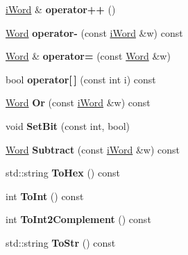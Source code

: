 \begin{DoxyCompactItemize}
\item 
\hypertarget{classWord_a3837f49bcb44597e6d738ccb0eeed144}{
\hyperlink{classiWord}{iWord} \& {\bfseries operator++} ()}
\label{classWord_a3837f49bcb44597e6d738ccb0eeed144}

\item 
\hypertarget{classWord_af930dcccdcf2cdbb90df31ac61a4933c}{
\hyperlink{classWord}{Word} {\bfseries operator-\/} (const \hyperlink{classiWord}{iWord} \&w) const }
\label{classWord_af930dcccdcf2cdbb90df31ac61a4933c}

\item 
\hypertarget{classWord_a437535c5c19c0ecfc01d52e2c297fe2c}{
\hyperlink{classWord}{Word} \& {\bfseries operator=} (const \hyperlink{classWord}{Word} \&w)}
\label{classWord_a437535c5c19c0ecfc01d52e2c297fe2c}

\item 
\hypertarget{classWord_a0b08a81ced05b38d3d719ef70ecb3215}{
bool {\bfseries operator\mbox{[}$\,$\mbox{]}} (const int i) const }
\label{classWord_a0b08a81ced05b38d3d719ef70ecb3215}

\item 
\hypertarget{classWord_a681da292897265ae47f144a99d49d9ec}{
\hyperlink{classWord}{Word} {\bfseries Or} (const \hyperlink{classiWord}{iWord} \&w) const }
\label{classWord_a681da292897265ae47f144a99d49d9ec}

\item 
\hypertarget{classWord_a8449f26fb840ca22dcc2ba3fc816d068}{
void {\bfseries SetBit} (const int, bool)}
\label{classWord_a8449f26fb840ca22dcc2ba3fc816d068}

\item 
\hypertarget{classWord_aef1af160cdcc631473aec52ea883e2e5}{
\hyperlink{classWord}{Word} {\bfseries Subtract} (const \hyperlink{classiWord}{iWord} \&w) const }
\label{classWord_aef1af160cdcc631473aec52ea883e2e5}

\item 
\hypertarget{classWord_af71af6fa290db8e9b4719c2b95ba9af0}{
std::string {\bfseries ToHex} () const }
\label{classWord_af71af6fa290db8e9b4719c2b95ba9af0}

\item 
\hypertarget{classWord_acf9a6c3d9cf07d66da592ec76f572464}{
int {\bfseries ToInt} () const }
\label{classWord_acf9a6c3d9cf07d66da592ec76f572464}

\item 
\hypertarget{classWord_a4116e08d36472a287c06a4aa14e7ed4f}{
int {\bfseries ToInt2Complement} () const }
\label{classWord_a4116e08d36472a287c06a4aa14e7ed4f}

\item 
\hypertarget{classWord_a5f8c5dcdb847ed96021ef9282ccc7e76}{
std::string {\bfseries ToStr} () const }
\label{classWord_a5f8c5dcdb847ed96021ef9282ccc7e76}

\end{DoxyCompactItemize}
